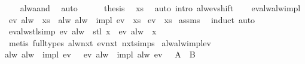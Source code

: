 \begin{isabellebody}
\ {\isasymphi}{\isasymphi}\ \isamarkupfalse%
\ alw{\isacharunderscore}aand\ \isamarkupfalse%
\ auto\isanewline
\ \ \ \ \isamarkupfalse%
\ {\isacharquery}thesis\ \isamarkupfalse%
\ xs{}\ \isamarkupfalse%
\ {\isacharparenleft}auto\ intro{\isacharcolon}\ alw{\isacharunderscore}ev{\isacharunderscore}shift{\isacharparenright}\isanewline
\ \ \isamarkupfalse%
\isanewline
{}\isamarkupfalse%
%
\endisatagproof
{\isafoldproof}%
%
\isadelimproof
\isanewline
%
\endisadelimproof
\isanewline
{}\isamarkupfalse%
\ ev{\isacharunderscore}alw{\isacharunderscore}alw{\isacharunderscore}impl{\isacharcolon}\isanewline
{}\ {\isachardoublequoteopen}ev\ {\isacharparenleft}alw\ {\isasymphi}{\isacharparenright}\ xs{\isachardoublequoteclose}\ \ {\isachardoublequoteopen}alw\ {\isacharparenleft}alw\ {\isasymphi}\ impl\ ev\ {\isasympsi}{\isacharparenright}\ xs{\isachardoublequoteclose}\isanewline
{}\ {\isachardoublequoteopen}ev\ {\isasympsi}\ xs{\isachardoublequoteclose}\isanewline
%
\isadelimproof
%
\endisadelimproof
%
\isatagproof
{}\isamarkupfalse%
\ assms\ \isamarkupfalse%
\ induct\ auto%
\endisatagproof
{\isafoldproof}%
%
\isadelimproof
\isanewline
%
\endisadelimproof
\isanewline
{}\isamarkupfalse%
\ ev{\isacharunderscore}alw{\isacharunderscore}stl{\isacharbrackleft}simp{\isacharbrackright}{\isacharcolon}\ {\isachardoublequoteopen}ev\ {\isacharparenleft}alw\ {\isasymphi}{\isacharparenright}\ {\isacharparenleft}stl\ x{\isacharparenright}\ {\isasymlongleftrightarrow}\ ev\ {\isacharparenleft}alw\ {\isasymphi}{\isacharparenright}\ x{\isachardoublequoteclose}\isanewline
%
\isadelimproof
%
\endisadelimproof
%
\isatagproof
{}\isamarkupfalse%
\ {\isacharparenleft}metis\ {\isacharparenleft}full{\isacharunderscore}types{\isacharparenright}\ alw{\isacharunderscore}nxt\ ev{\isacharunderscore}nxt\ nxt{\isachardot}simps{\isacharparenright}%
\endisatagproof
{\isafoldproof}%
%
\isadelimproof
\isanewline
%
\endisadelimproof
\isanewline
{}\isamarkupfalse%
\ alw{\isacharunderscore}alw{\isacharunderscore}impl{\isacharunderscore}ev{\isacharcolon}\isanewline
{\isachardoublequoteopen}alw\ {\isacharparenleft}alw\ {\isasymphi}\ impl\ ev\ {\isasympsi}{\isacharparenright}\ {\isacharequal}\ {\isacharparenleft}ev\ {\isacharparenleft}alw\ {\isasymphi}{\isacharparenright}\ impl\ alw\ {\isacharparenleft}ev\ {\isasympsi}{\isacharparenright}{\isacharparenright}{\isachardoublequoteclose}\ {\isacharparenleft}\ {\isachardoublequoteopen}{\isacharquery}A\ {\isacharequal}\ {\isacharquery}B{\isachardoublequoteclose}{\isacharparenright}\isanewline

\end{isabellebody}
